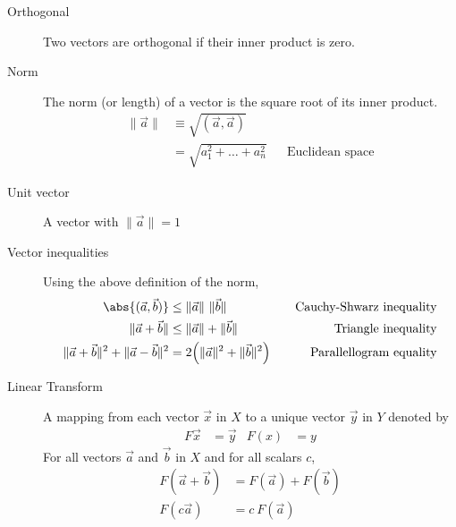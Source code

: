 \begin{description}
    \item[Orthogonal] Two vectors are orthogonal if their inner product is zero.
    \item[Norm] The norm (or length) of a vector is the square root of its inner product.
        \begin{align}
            \lVert \vec{a} \rVert & \equiv \sqrt{(\vec{a}, \vec{a})}   \\
                                  & = \sqrt{a_1^2 + \dots + a_n^2}   &
                                  & \text{Euclidean space}
        \end{align}
    \item[Unit vector] A vector with $ \lVert \vec{a} \rVert = 1 $

    \item[Vector inequalities] Using the above definition of the norm,
        \begin{align}
            \abs{ (\vec{a}, \vec{b}) }                                      &
            \leq \lVert \vec{a} \rVert\ \lVert \vec{b} \rVert               &
                                                                            &   &
            \text{Cauchy-Shwarz inequality}                                       \\
            \lVert \vec{a} + \vec{b} \rVert                                 &
            \leq \lVert \vec{a} \rVert + \lVert \vec{b} \rVert              &
                                                                            &   &
            \text{Triangle inequality}                                            \\
            \lVert \vec{a} + \vec{b} \rVert^2
            + \lVert \vec{a} - \vec{b} \rVert^2                             &
            = 2\Big(\lVert \vec{a} \rVert^2 + \lVert \vec{b} \rVert^2 \Big) &
                                                                            &   &
            \text{Parallellogram equality}
        \end{align}

    \item[Linear Transform] A mapping from each vector $ \vec{x} $ in $ X $ to a
        unique vector $ \vec{y} $ in $ Y $ denoted by
        \begin{align}
            F\vec{x} & = \vec{y} & F(x) & = y
        \end{align}
        For all vectors $ \vec{a} $ and $ \vec{b} $ in $ X $ and for all scalars $ c $,
        \begin{align}
            F(\vec{a} + \vec{b}) & = F(\vec{a}) + F(\vec{b}) \\
            F(c\vec{a})          & = c\ F(\vec{a})
        \end{align}


\end{description}

